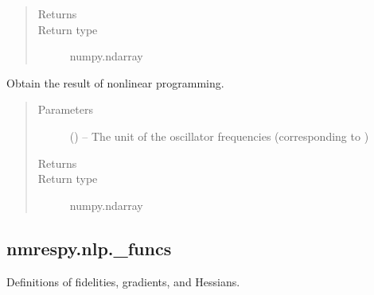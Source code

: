 \documentclass[letterpaper,10pt,english]{sphinxmanual}
\begin{document}
\begin{fulllineitems}
\begin{fulllineitems}
\begin{quote}
\begin{description}
\item[{Returns}] \leavevmode
\sphinxAtStartPar
{}

\item[{Return type}] \leavevmode
\sphinxAtStartPar
numpy.ndarray

\end{description}\end{quote}

\end{fulllineitems}


\begin{fulllineitems}
\label{\detokenize{references/nlp/nlp:nmrespy.nlp.nlp.NonlinearProgramming.get_result}}
\sphinxAtStartPar
Obtain the result of nonlinear programming.
\begin{quote}\begin{description}
\item[{Parameters}] \leavevmode
\sphinxAtStartPar
{} (\sphinxstyleliteralemphasis{\sphinxupquote{, }}) – The unit of the oscillator frequencies (corresponding to
)

\item[{Returns}] \leavevmode
\sphinxAtStartPar
{}

\item[{Return type}] \leavevmode
\sphinxAtStartPar
numpy.ndarray

\end{description}\end{quote}

\end{fulllineitems}


\end{fulllineitems}





\subsection{nmrespy.nlp.\_funcs}
\label{\detokenize{references/nlp/_funcs:module-nmrespy.nlp._funcs}}\label{\detokenize{references/nlp/_funcs:nmrespy-nlp-funcs}}\label{\detokenize{references/nlp/_funcs::doc}}
\sphinxAtStartPar
Definitions of fidelities, gradients, and Hessians.
\end{document}
